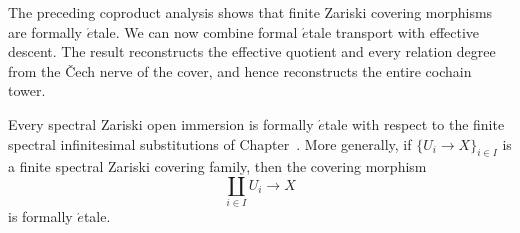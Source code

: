 The preceding coproduct analysis shows that finite Zariski covering morphisms
are formally \(\acute{e}\)tale. We can now combine formal
\(\acute{e}\)tale transport with effective descent. The result reconstructs
the effective quotient and every relation degree from the \v{C}ech nerve of
the cover, and hence reconstructs the entire cochain tower.

\begin{lemma}
\label{lem:zariski-open-formally-etale}
Every spectral Zariski open immersion is formally \(\acute{e}\)tale with respect to
the finite spectral infinitesimal substitutions of
Chapter~. More generally, if
\(\{U_i\to X\}_{i\in I}\) is a finite spectral Zariski covering family, then the
covering morphism
\[
  \coprod_{i\in I}U_i\longrightarrow X
\]
is formally \(\acute{e}\)tale.
\end{lemma}

